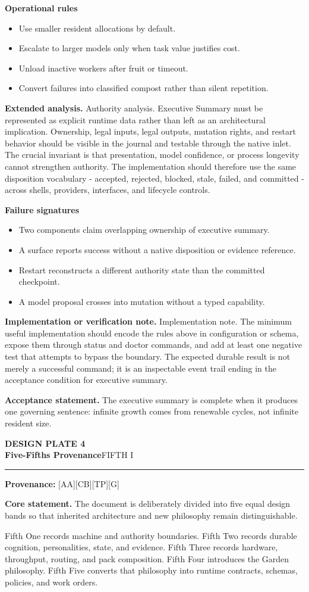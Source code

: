\documentclass[10pt,letterpaper,oneside]{article}
\newcommand{\prov}[1]{\textcolor{gardenBlue}{\sffamily\footnotesize\textbf{Provenance:} #1}}
\newcommand{\platetitle}[3]{%
  \begin{minipage}[t][0.54in][t]{\textwidth}
  {\sffamily\bfseries\color{gardenDeep}\fontsize{9}{10}\selectfont DESIGN PLATE #1}\\[-1pt]
  {\sffamily\bfseries\color{gardenInk}\fontsize{16.5}{18}\selectfont #2}\hfill{\sffamily\color{gardenGreen}\large #3}
  \end{minipage}\vspace{-2pt}\hrule\vspace{5pt}}
\begin{document}
\textbf{Operational rules}
\begin{itemize}
\item Use smaller resident allocations by default.
\item Escalate to larger models only when task value justifies cost.
\item Unload inactive workers after fruit or timeout.
\item Convert failures into classified compost rather than silent repetition.
\end{itemize}
\textbf{Extended analysis.} Authority analysis. Executive Summary must be represented as explicit runtime data rather than left as an architectural implication. Ownership, legal inputs, legal outputs, mutation rights, and restart behavior should be visible in the journal and testable through the native inlet. The crucial invariant is that presentation, model confidence, or process longevity cannot strengthen authority. The implementation should therefore use the same disposition vocabulary - accepted, rejected, blocked, stale, failed, and committed - across shells, providers, interfaces, and lifecycle controls.

\textbf{Failure signatures}
\begin{itemize}
\item Two components claim overlapping ownership of executive summary.
\item A surface reports success without a native disposition or evidence reference.
\item Restart reconstructs a different authority state than the committed checkpoint.
\item A model proposal crosses into mutation without a typed capability.
\end{itemize}
\textbf{Implementation or verification note.} Implementation note. The minimum useful implementation should encode the rules above in configuration or schema, expose them through status and doctor commands, and add at least one negative test that attempts to bypass the boundary. The expected durable result is not merely a successful command; it is an inspectable event trail ending in the acceptance condition for executive summary.

\begin{acceptbox}
\textbf{Acceptance statement.} The executive summary is complete when it produces one governing sentence: infinite growth comes from renewable cycles, not infinite resident size.
\end{acceptbox}
\newpage
\platetitle{4}{Five-Fifths Provenance}{FIFTH I}
\prov{[AA][CB][TP][G]}
\fontsize{8.85}{10.45}\selectfont
\begin{corebox}
\textbf{Core statement.} The document is deliberately divided into five equal design bands so that inherited architecture and new philosophy remain distinguishable.
\end{corebox}
Fifth One records machine and authority boundaries. Fifth Two records durable cognition, personalities, state, and evidence. Fifth Three records hardware, throughput, routing, and pack composition. Fifth Four introduces the Garden philosophy. Fifth Five converts that philosophy into runtime contracts, schemas, policies, and work orders.
\end{document}
